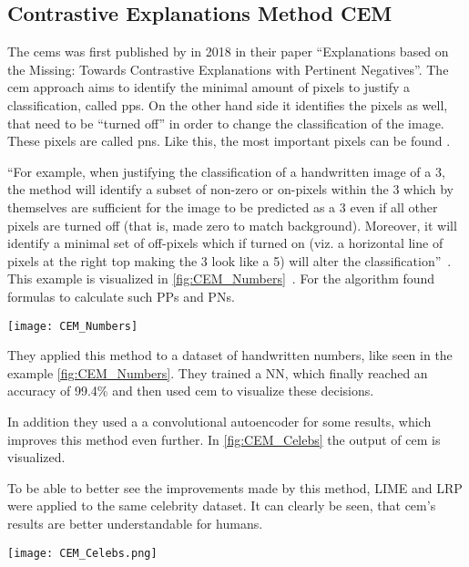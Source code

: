 \subsection{Contrastive Explanations Method CEM}
The \glspl{cem} was first published by  in 2018 in their paper “Explanations based on the Missing: Towards Contrastive Explanations with Pertinent Negatives”.
The \gls{cem} approach aims to identify the minimal amount of pixels to justify a classification, called \glspl{pp}. On the other hand side it identifies the pixels as well, that need to be “turned off” in order to change the classification of the image. These pixels are called \glspl{pn}. Like this, the most important pixels can be found . 
\par
“For example, when justifying the classification of a handwritten image of a 3, the method will identify a subset of non-zero or on-pixels within the 3 which by themselves are sufficient for the image to be predicted as a 3 even if all other pixels are turned off (that is, made zero to match background). Moreover, it will identify a minimal set of off-pixels which if turned on (viz. a horizontal line of pixels at the right top making the 3 look like a 5) will alter the classification”~\cite[2]{Luss.}.
This example is visualized in \cref{fig:CEM_Numbers}~\cite{Dhurandhar.2018}.
For the algorithm  found formulas to calculate such PPs and PNs.
\begin{figure*}[h]
    \center
    \texttt{[image: CEM\_Numbers]}
    \caption{CEM, LRP and LIME applied to a number dataset,~\cite{Dhurandhar.2018}}
    \label{fig:CEM_Numbers}
\end{figure*}
They applied this method to a dataset of handwritten numbers, like seen in the example \cref{fig:CEM_Numbers}. They trained a NN, which finally reached an accuracy of 99.4\% and then used \gls{cem} to visualize these decisions. 
\par 
In addition they used a a convolutional autoencoder for some results, which improves this method even further. In \cref{fig:CEM_Celebs} the output of \gls{cem} is visualized. 
\par
To be able to better see the improvements made by this method, LIME and LRP were applied to the same celebrity dataset. It can clearly be seen, that \gls{cem}'s results are better understandable for humans.
\begin{figure*}[h]
    \center
    \texttt{[image: CEM\_Celebs.png]}
    \caption{CEM and LIME applied to a celebrity dataset~\cite{Luss.}}\label{fig:CEM_Celebs}
\end{figure*}

